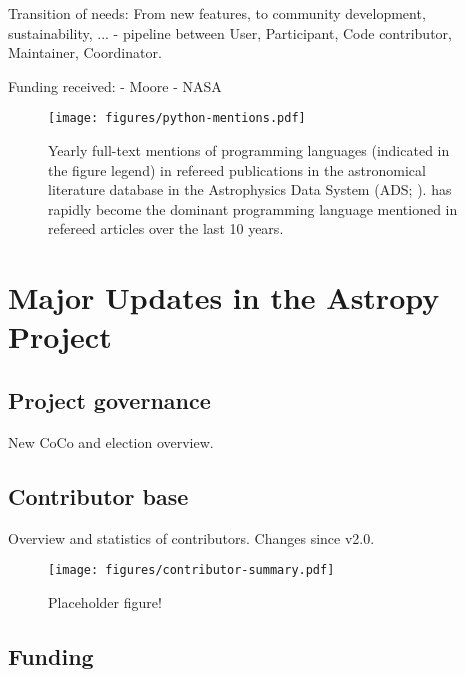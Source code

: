 \documentclass[modern]{aastex631}
\begin{document}
Transition of needs: From new features, to community development, sustainability, ...
- pipeline between User, Participant, Code contributor, Maintainer, Coordinator.

Funding received:
- Moore
- NASA




\begin{figure}
    \begin{centering}
        \texttt{[image: figures/python-mentions.pdf]}
        \caption{
            Yearly full-text mentions of programming languages (indicated in the
            figure legend) in refereed publications in the astronomical
            literature database in the Astrophysics Data System (ADS;
            \citealt{ads}).
            \python has rapidly become the dominant programming language
            mentioned in refereed articles over the last 10 years.
        }
        \label{fig:python-mentions}
    \end{centering}
\end{figure}


\section{Major Updates in the Astropy Project} \label{sec:project-updates}


\subsection{Project governance} \label{sec:project-governance}

New CoCo and election overview.


\subsection{Contributor base} \label{sec:project-contributors}

Overview and statistics of contributors. Changes since v2.0.

\begin{figure}
    \begin{centering}
        \texttt{[image: figures/contributor-summary.pdf]}
        \caption{Placeholder figure!}
        \label{fig:contributor-summary}
    \end{centering}
\end{figure}



\subsection{Funding} \label{sec:project-funding}
\end{document}
